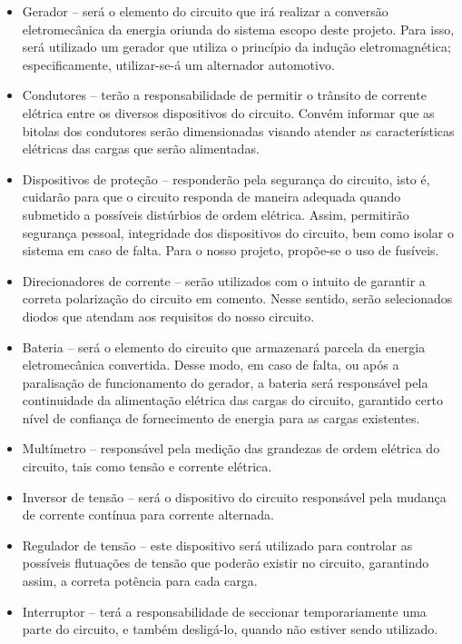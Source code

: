 \begin{itemize}
\item Gerador – será o elemento do circuito que irá realizar a conversão eletromecânica da energia oriunda do sistema escopo deste projeto. Para isso, será utilizado um gerador que utiliza o princípio da indução eletromagnética; especificamente, utilizar-se-á um alternador automotivo.
\item Condutores – terão a responsabilidade de permitir o trânsito de corrente elétrica entre os diversos dispositivos do circuito. Convém informar que as bitolas dos condutores serão dimensionadas visando atender as características elétricas das cargas que serão alimentadas.
\item Dispositivos de proteção – responderão pela segurança do circuito, isto é, cuidarão para que o circuito responda de maneira adequada quando submetido a possíveis distúrbios de ordem elétrica. Assim, permitirão segurança pessoal, integridade dos dispositivos do circuito, bem como isolar o sistema em caso de falta. Para o nosso projeto, propõe-se o uso de fusíveis.
\item Direcionadores de corrente – serão utilizados com o intuito de garantir a correta polarização do circuito em comento. Nesse sentido, serão selecionados diodos que atendam aos requisitos do nosso circuito.
\item Bateria – será o elemento do circuito que armazenará parcela da energia eletromecânica convertida. Desse modo, em caso de falta, ou após a paralisação de funcionamento do gerador, a bateria será responsável pela continuidade da alimentação elétrica das cargas do circuito, garantido certo nível de confiança de fornecimento de energia para as cargas existentes.
\item Multímetro – responsável pela medição das grandezas de ordem elétrica do circuito, tais como tensão e corrente elétrica.
\item Inversor de tensão – será o dispositivo do circuito responsável pela mudança de corrente contínua para corrente alternada.
\item Regulador de tensão – este dispositivo será utilizado para controlar as possíveis flutuações de tensão que poderão existir no circuito, garantindo assim, a correta potência para cada carga.
\item Interruptor – terá a responsabilidade de seccionar temporariamente uma parte do circuito, e também desligá-lo, quando não estiver sendo utilizado. 
\end{itemize}

